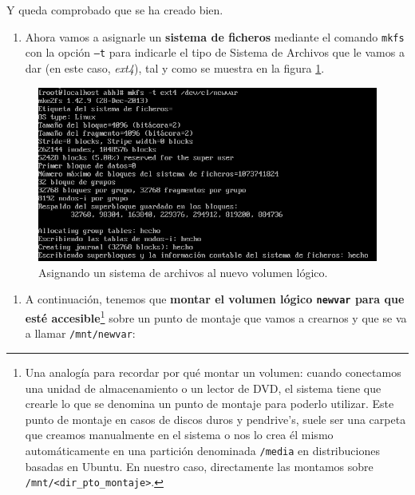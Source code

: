 \documentclass[
]{book}
\providecommand{\tightlist}{%
  \setlength{\itemsep}{0pt}\setlength{\parskip}{0pt}}
\begin{document}
Y queda comprobado que se ha creado bien.

\begin{enumerate}
\def\labelenumi{\arabic{enumi}.}
\setcounter{enumi}{6}
\tightlist
\item
  Ahora vamos a asignarle un \textbf{sistema de ficheros} mediante el comando \texttt{mkfs} con la opción \texttt{–t} para indicarle el tipo de Sistema de Archivos que le vamos a dar (en este caso, \emph{ext4}), tal y como se muestra en la figura \ref{fig:g}.
\end{enumerate}

\begin{figure}

{\centering \includegraphics[width=0.8\linewidth]{images/g} 

}

\caption{Asignando un sistema de archivos al nuevo volumen lógico.}\label{fig:g}
\end{figure}

\begin{enumerate}
\def\labelenumi{\arabic{enumi}.}
\setcounter{enumi}{7}
\tightlist
\item
  A continuación, tenemos que \textbf{montar el volumen lógico \texttt{newvar} para que esté accesible}\footnote{Una analogía para recordar por qué montar un volumen: cuando conectamos una unidad de almacenamiento o un lector de DVD, el sistema tiene que crearle lo que se denomina un punto de montaje para poderlo utilizar. Este punto de montaje en casos de discos duros y pendrive's, suele ser una carpeta que creamos manualmente en el sistema o nos lo crea él mismo automáticamente en una partición denominada \texttt{/media} en distribuciones basadas en Ubuntu. En nuestro caso, directamente las montamos sobre \texttt{/mnt/\textless{}dir\_pto\_montaje\textgreater{}}.} sobre un punto de montaje que vamos a crearnos y que se va a llamar \texttt{/mnt/newvar}:
\end{enumerate}
\end{document}
